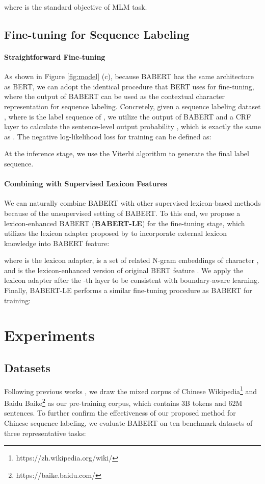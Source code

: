 \documentclass[11pt]{article}
\begin{document}
\begin{CJK}{UTF8}{gbsn}
where  is the standard objective of MLM task.

\subsection{Fine-tuning for Sequence Labeling}
\paragraph{Straightforward Fine-tuning}
As shown in Figure \ref{fig:model} (c), because BABERT has the same architecture as BERT,
we can adopt the identical procedure that BERT uses for fine-tuning, where the output of BABERT can be used as the contextual character representation for sequence labeling.
Concretely, given a sequence labeling dataset ,
where  is the label sequence of ,
we utilize the output of BABERT and a CRF layer to calculate the sentence-level output probability ,
which is exactly the same as \citet{liu-etal-2021-lexicon}.
The negative log-likelihood loss for training can be defined as:

At the inference stage, we use the Viterbi algorithm \cite{viterbi1967error} to generate the final label sequence. 

\paragraph{Combining with Supervised Lexicon Features}
We can naturally combine BABERT with other supervised lexicon-based methods because of the unsupervised setting of BABERT.
To this end, we propose a lexicon-enhanced BABERT (\textbf{BABERT-LE}) for the fine-tuning stage,
which utilizes the lexicon adapter proposed by \citet{liu-etal-2021-lexicon} to incorporate external lexicon knowledge into BABERT feature:

where  is the lexicon adapter,
 is a set of related N-gram embeddings of character ,
and  is the lexicon-enhanced version of original BERT feature .
We apply the lexicon adapter after the -th layer to be consistent with boundary-aware learning.
Finally, BABERT-LE performs a similar fine-tuning procedure as BABERT for training:



\section{Experiments}



\subsection{Datasets}
Following previous works \cite{devlin2018bert, xiao-etal-2021-ernie},
we draw the mixed corpus of Chinese Wikipedia\footnote{https://zh.wikipedia.org/wiki/} and Baidu Baike\footnote{https://baike.baidu.com/} as our pre-training corpus, which contains 3B tokens and 62M sentences. To further confirm the effectiveness of our proposed method for Chinese sequence labeling,
we evaluate BABERT on ten benchmark datasets of three representative tasks:


\end{CJK}
\end{document}
